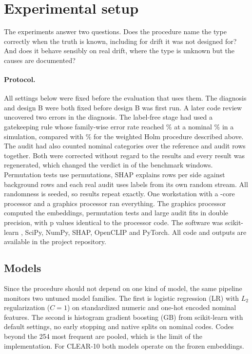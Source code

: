 \documentclass[10pt]{article}
\newif\ifanonymous
\begin{document}
\section{Experimental setup}
\label{sec:setup}

The experiments answer two questions. Does the procedure name the type correctly when the truth is known, including for drift it was not designed for? And does it behave sensibly on real drift, where the type is unknown but the causes are documented?

\paragraph{Protocol.} All settings below were fixed before the evaluation that uses them. The diagnosis and design B were both fixed before design B was first run. A later code review uncovered two errors in the diagnosis. The label-free stage had used a gatekeeping rule whose family-wise error rate reached \% at a nominal \% in a simulation, compared with \% for the weighted Holm procedure described above. The audit had also counted nominal categories over the reference and audit rows together. Both were corrected without regard to the results and every result was regenerated, which changed the verdict in  of the  benchmark windows. Permutation tests use  permutations, SHAP explains  rows per side against  background rows and each real audit uses  labels from its own random stream. All randomness is seeded, so results repeat exactly. One workstation with a -core processor and a graphics processor ran everything. The graphics processor computed the embeddings, permutation tests and large audit fits in double precision, with p values identical to the processor code. The software was scikit-learn \cite{pedregosa2011scikit}, SciPy, NumPy, SHAP, OpenCLIP and PyTorch. All code and outputs are available\ifanonymous{} (link withheld for review)\else{} in the project repository\fi.

\subsection{Models}
Since the procedure should not depend on one kind of model, the same pipeline monitors two untuned model families. The first is logistic regression (LR) with $L_2$ regularization ($C=1$) on standardized numeric and one-hot encoded nominal features. The second is histogram gradient boosting (GB) \cite{ke2017lightgbm} from scikit-learn \cite{pedregosa2011scikit} with default settings, no early stopping and native splits on nominal codes. Codes beyond the 254 most frequent are pooled, which is the limit of the implementation. For CLEAR-10 both models operate on the frozen embeddings.
\end{document}
